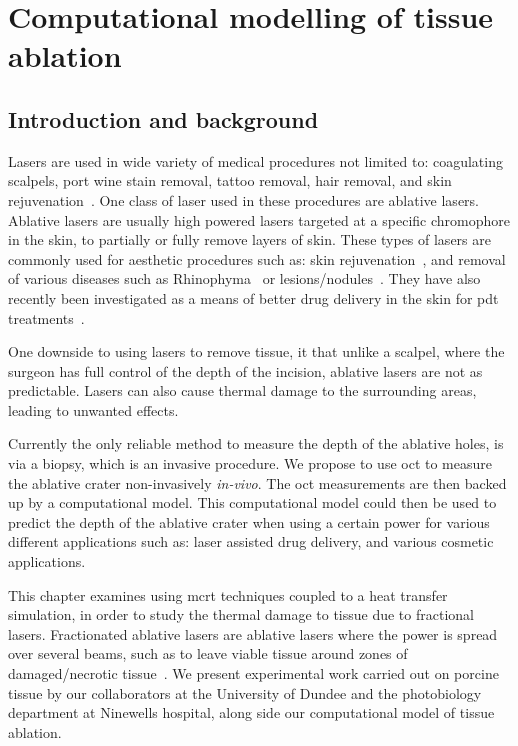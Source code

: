 \chapter{Computational modelling of tissue ablation}

\section{Introduction and background}%
Lasers are used in wide variety of medical procedures not limited to: coagulating scalpels, port wine stain removal, tattoo removal, hair removal, and skin rejuvenation~\cite{amini2010ultrafast, tan1989treatment,kuperman2001laser,liew2002laser,hardaway2002nonablative}.
One class of laser used in these procedures are ablative lasers. Ablative lasers are usually high powered lasers targeted at a specific chromophore in the skin, to partially or fully remove layers of skin. These types of lasers are commonly used for aesthetic procedures such as: skin rejuvenation~\cite{hardaway2002nonablative}, and removal of various diseases such as Rhinophyma~\cite{shapshay1980removal} or lesions/nodules~\cite{valcavi2010percutaneous}. They have also recently been investigated as a means of better drug delivery in the skin for \gls{pdt} treatments~\cite{haedersdal2010fractional}.

One downside to using lasers to remove tissue, it that unlike a scalpel, where the surgeon has full control of the depth of the incision, ablative lasers are not as predictable. Lasers can also cause  thermal damage to the surrounding areas, leading to unwanted effects.

 Currently the only reliable method to measure the depth of the ablative holes, is via a biopsy, which is an invasive procedure. We propose to use \gls{oct} to measure the ablative crater non-invasively \textit{in-vivo}. The \gls{oct} measurements are then backed up by a computational model. This computational model could then be used to predict the depth of the ablative crater when using a certain power for various different applications such as: laser assisted drug delivery, and various cosmetic applications.

This chapter examines using \gls{mcrt} techniques coupled to a heat transfer simulation, in order to study the thermal damage to tissue due to fractional lasers. Fractionated ablative lasers  are ablative lasers where the power is spread over several beams, such as to leave viable tissue around zones of damaged/necrotic tissue~\cite{manstein2004fractional}. We present experimental work carried out on porcine tissue by our collaborators at the University of Dundee and the photobiology department at Ninewells hospital, along side our computational model of tissue ablation.

